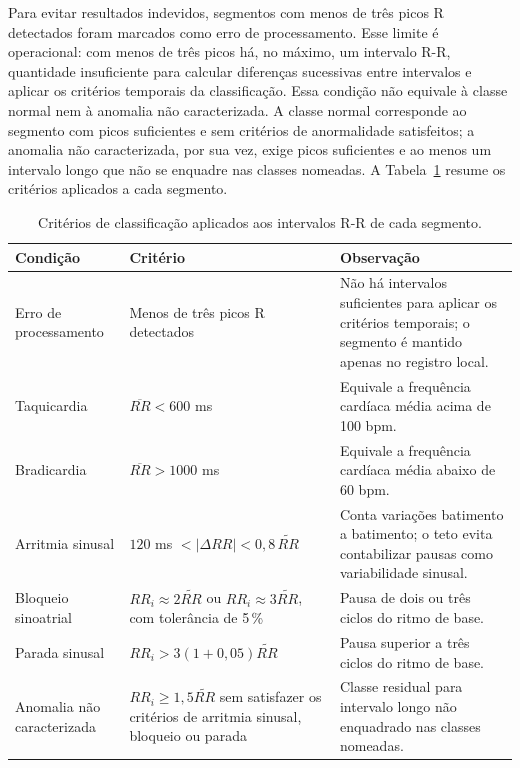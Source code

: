 Para evitar resultados indevidos, segmentos com menos de três picos R detectados foram marcados como erro de processamento. Esse limite é operacional: com menos de três picos há, no máximo, um intervalo R-R, quantidade insuficiente para calcular diferenças sucessivas entre intervalos e aplicar os critérios temporais da classificação. Essa condição não equivale à classe normal nem à anomalia não caracterizada. A classe normal corresponde ao segmento com picos suficientes e sem critérios de anormalidade satisfeitos; a anomalia não caracterizada, por sua vez, exige picos suficientes e ao menos um intervalo longo que não se enquadre nas classes nomeadas. A Tabela~\ref{tab:criteriosClassificacao} resume os critérios aplicados a cada segmento.

\begin{table}[H]
    \centering
    \caption{Critérios de classificação aplicados aos intervalos R-R de cada segmento.}
    \label{tab:criteriosClassificacao}
    \small
    \setlength{\tabcolsep}{4pt}
    \renewcommand{\arraystretch}{1.08}
    \begin{tabular}{>{\raggedright\arraybackslash}p{3.6cm}>{\raggedright\arraybackslash}p{5.1cm}>{\raggedright\arraybackslash}p{5.0cm}}
        \hline
        \textbf{Condição} & \textbf{Critério} & \textbf{Observação} \\ \hline
        Erro de processamento & Menos de três picos R detectados & Não há intervalos suficientes para aplicar os critérios temporais; o segmento é mantido apenas no registro local. \\ \hline
        Taquicardia & $\overline{RR} < 600$ ms & Equivale a frequência cardíaca média acima de 100 bpm. \\ \hline
        Bradicardia & $\overline{RR} > 1000$ ms & Equivale a frequência cardíaca média abaixo de 60 bpm. \\ \hline
        Arritmia sinusal & $120$ ms $< |\Delta RR| < 0{,}8\,\widetilde{RR}$ & Conta variações batimento a batimento; o teto evita contabilizar pausas como variabilidade sinusal. \\ \hline
        Bloqueio sinoatrial & $RR_i \approx 2\widetilde{RR}$ ou $RR_i \approx 3\widetilde{RR}$, com tolerância de 5\,\% & Pausa de dois ou três ciclos do ritmo de base. \\ \hline
        Parada sinusal & $RR_i > 3(1+0{,}05)\widetilde{RR}$ & Pausa superior a três ciclos do ritmo de base. \\ \hline
        Anomalia não caracterizada & $RR_i \ge 1{,}5\widetilde{RR}$ sem satisfazer os critérios de arritmia sinusal, bloqueio ou parada & Classe residual para intervalo longo não enquadrado nas classes nomeadas. \\ \hline
    \end{tabular}
\end{table}

